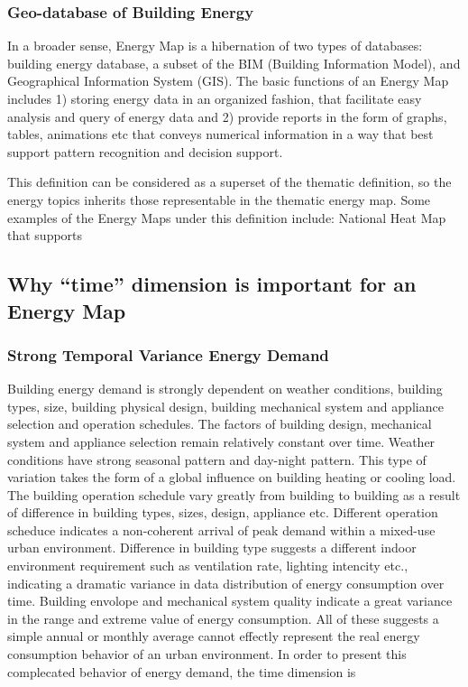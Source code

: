 \documentclass[12pt]{article}
\begin{document}
\subsubsection{Geo-database of Building Energy}
In a broader sense, Energy Map is a hibernation of two types of
databases: building energy database, a subset of the BIM (Building
Information Model), and Geographical Information System (GIS). The
basic functions of an Energy Map includes 1) storing energy data in an
organized fashion, that facilitate easy analysis and query of energy
data and 2) provide reports in the form of graphs, tables, animations
etc that conveys numerical information in a way that best support
pattern recognition and decision support. 

This definition can be considered as a superset of the thematic
definition, so the energy topics inherits those representable in the
thematic energy map. Some examples of the Energy Maps under this
definition include: National Heat Map that supports 

\subsection{Why ``time'' dimension is important for an Energy Map}
\subsubsection{Strong Temporal Variance Energy Demand}
Building energy demand is strongly dependent on weather conditions,
building types, size, building physical design, building mechanical
system and appliance selection and operation schedules. The factors of
building design, mechanical system and appliance selection remain
relatively constant over time. Weather conditions have strong seasonal
pattern and day-night pattern. This type of variation takes the form
of a global influence on building heating or cooling load. The
building operation schedule vary greatly from building to building as
a result of difference in building types, sizes, design, appliance
etc. Different operation scheduce indicates a non-coherent arrival of
peak demand within a mixed-use urban environment. Difference in
building type suggests a different indoor environment requirement such
as ventilation rate, lighting intencity etc., indicating a dramatic
variance in data distribution of energy consumption over
time. Building envolope and mechanical system quality indicate a great
variance in the range and extreme value of energy consumption. All of
these suggests a simple annual or monthly average cannot effectly
represent the real energy consumption behavior of an urban
environment. In order to present this complecated behavior of energy
demand, the time dimension is 
\end{document}
